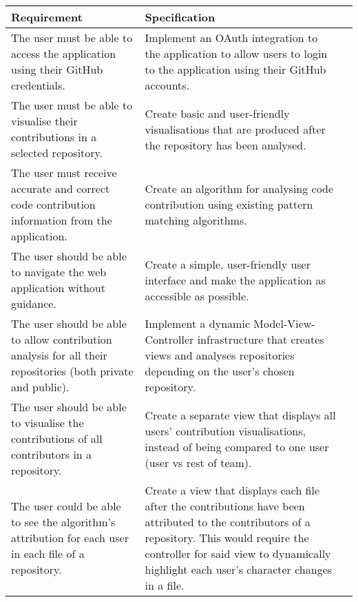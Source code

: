 \begin{tabularx}{1\textwidth}{
  | >{\raggedright\arraybackslash}X 
  | >{\centering\arraybackslash}X 
  | >{\raggedleft\arraybackslash}X | }
\hline
\textbf{Requirement} & \textbf{Specification} \\ \hline

The user must be able to access the application using their GitHub credentials. & Implement an OAuth integration to the application to allow users to login to the application using their GitHub accounts. \\ \hline

The user must be able to visualise their contributions in a selected repository. & Create basic and user-friendly visualisations that are produced after the repository has been analysed. \\ \hline

The user must receive accurate and correct code contribution information from the application. & Create an algorithm for analysing code contribution using existing pattern matching algorithms. \\ \hline

The user should be able to navigate the web application without guidance. & Create a simple, user-friendly user interface and make the application as accessible as possible. \\ \hline

The user should be able to allow contribution analysis for all their repositories (both private and public). & Implement a dynamic Model-View-Controller infrastructure that creates views and analyses repositories depending on the user's chosen repository. \\ \hline

The user should be able to visualise the contributions of all contributors in a repository. & Create a separate view that displays all users' contribution visualisations, instead of being compared to one user (user vs rest of team). \\ \hline 

The user could be able to see the algorithm's attribution for each user in each file of a repository. & Create a view that displays each file after the contributions have been attributed to the contributors of a repository. This would require the controller for said view to dynamically highlight each user's character changes in a file. \\ \hline

\end{tabularx}